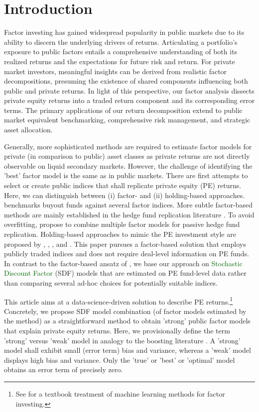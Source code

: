 \documentclass[12pt]{article}
\begin{document}
\section{Introduction}
\label{sec:factor_investing}

Factor investing has gained widespread popularity in public markets due to its ability to discern the underlying drivers of returns. 
Articulating a portfolio's exposure to public factors entails a comprehensive understanding of both its realized returns and the expectations for future risk and return. 
For private market investors, meaningful insights can be derived from realistic factor decompositions, presuming the existence of shared components influencing both public and private returns. 
In light of this perspective, our factor analysis dissects private equity returns into a traded return component and its corresponding error terms. 
The primary applications of our return decomposition extend to public market equivalent benchmarking, comprehensive risk management, and strategic asset allocation.

Generally, more sophisticated methods are required to estimate factor models for private (in comparison to public) asset classes as private returns are not directly observable on liquid secondary markets.
However, the challenge of identifying the 'best' factor model is the same as in public markets.
There are first attempts to select or create public indices that shall replicate private equity (PE) returns.
Here, we can distinguish between (i) factor- and (ii) holding-based approaches.
\cite{P14} benchmarks buyout funds against several factor indices.
More subtle factor-based methods are mainly established in the hedge fund replication literature \citep{TV08,W14}.
To avoid overfitting, \cite{OST17} propose to combine multiple factor models for passive hedge fund replication.
Holding-based approaches to mimic the PE investment style are proposed by \cite{LSSL16}, \cite{S17}, \cite{MS19}, and \cite{PP19}.
This paper pursues a factor-based solution that employs publicly traded indices and does not require deal-level information on PE funds.
In contrast to the factor-based ansatz of \cite{P14}, we base our approach on 
\textcolor{darkgreen}{Stochastic Discount Factor} 
(SDF) models that are estimated on PE fund-level data rather than comparing several ad-hoc choices for potentially suitable indices.

This article aims at a data-science-driven solution to describe PE returns.\footnote{See \cite{CG23} for a textbook treatment of machine learning methods for factor investing.}
Concretely, we propose SDF model combination (of factor models estimated by the \cite{DLP12} method) as a straightforward method to obtain 'strong' public factor models that explain private equity returns.
Here, we provisionally define the term 'strong' versus 'weak' model in analogy to the boosting literature \citep{S90}.
A 'strong' model shall exhibit small (error term) bias and variance, whereas a 'weak' model displays high bias and variance.
Only the 'true' or 'best' or 'optimal' model obtains an error term of precisely zero.
\end{document}
